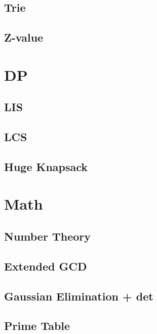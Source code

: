     \subsection{Trie}
        
    \subsection{Z-value}
        

\section{DP}
    \subsection{LIS}
        
    \subsection{LCS}
        
    \subsection{Huge Knapsack}
        

\section{Math}
    \subsection{Number Theory}
        
    \subsection{Extended GCD}
        
    \subsection{Gaussian Elimination + det}
        
    \subsection{Prime Table}
        
